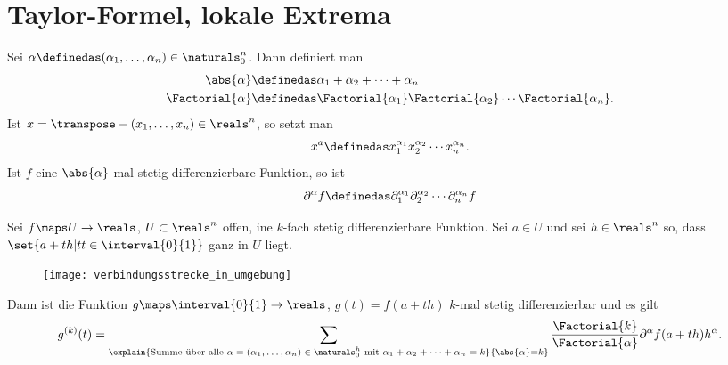 \section*{Taylor-Formel, lokale Extrema}
\begin{notation}
  Sei \( \alpha\definedas(\alpha_1,\dotsc,\alpha_n)\in \naturals_{0}^n \). Dann definiert man
  \begin{align*}
    \abs{\alpha}&\definedas\alpha_1+\alpha_2+\dotsb+\alpha_n\\
    \Factorial{\alpha}&\definedas \Factorial{\alpha_1}\Factorial{\alpha_2}\dotsb\Factorial{\alpha_n}.
  \end{align*}
  Ist \( x=\transpose-{(x_1,\dotsc,x_n)}\in \reals^n \), so setzt man 
  \begin{equation*}
    x^{a}\definedas x_1^{\alpha_1}x_2^{\alpha_2}\dotsb x_n^{\alpha_n}.
  \end{equation*}
  Ist \( f \) eine \( \abs{\alpha} \)-mal stetig differenzierbare Funktion, so ist 
  \begin{equation*}
    \partial^{\alpha}f\definedas \partial_1^{\alpha_1}\partial_2^{\alpha_2}\dotsb\partial_n^{\alpha_n}f
  \end{equation*}
\end{notation}
\begin{lemma}\label{funktion_entlang_gerade_ableitung}
  Sei \( f\maps U\to \reals \), \( U\subset \reals^n \) offen, ine \( k \)-fach stetig differenzierbare Funktion. Sei \( a\in U \) und sei \( h\in \reals^n \) so, dass \( \set{a+th|tt\in \interval{0}{1}} \) ganz in \( U \) liegt.
  \begin{figure}[H]
    \centering
    \texttt{[image: verbindungsstrecke\_in\_umgebung]}
    \label{fig:verbindungsstrecke_in_umgebung}
  \end{figure}
  Dann ist die Funktion \( g\maps \interval{0}{1}\to \reals \), \( g(t)=f(a+th) \) \( k \)-mal stetig differenzierbar und es gilt 
  \begin{equation*}
    g^{(k)}(t)=\sum_{\explain{\text{Summe über alle \( \alpha=(\alpha_1,\dotsc,\alpha_n)\in \naturals_0^h \) mit \( \alpha_1+\alpha_2+\dotsb+\alpha_n=k \)}}{\abs{\alpha}=k}}\frac{\Factorial{k}}{\Factorial{\alpha}}\partial^{\alpha}f(a+th)h^{\alpha}.
  \end{equation*}
\end{lemma}
